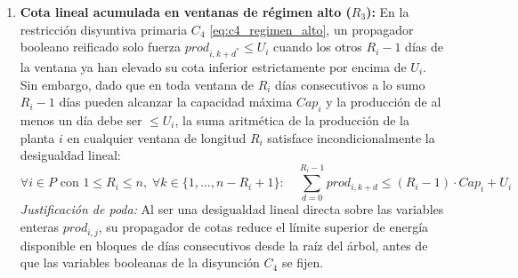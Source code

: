 \begin{enumerate}
    \item \textbf{Cota lineal acumulada en ventanas de régimen alto ($R_3$):}
    En la restricción disyuntiva primaria $C_4$ \eqref{eq:c4_regimen_alto}, un propagador booleano reificado solo fuerza $prod_{i, k+d^*} \le U_i$ cuando los otros $R_i - 1$ días de la ventana ya han elevado su cota inferior estrictamente por encima de $U_i$. Sin embargo, dado que en toda ventana de $R_i$ días consecutivos a lo sumo $R_i - 1$ días pueden alcanzar la capacidad máxima $Cap_i$ y la producción de al menos un día debe ser $\le U_i$, la suma aritmética de la producción de la planta $i$ en cualquier ventana de longitud $R_i$ satisface incondicionalmente la desigualdad lineal:
    \begin{equation}
        \forall i \in P \text{ con } 1 \le R_i \le n, \; \forall k \in \{1, \dots, n - R_i + 1\}: \quad \sum_{d=0}^{R_i - 1} prod_{i, k+d} \le (R_i - 1)\cdot Cap_i + U_i
        \label{eq:r3_ventana_lineal}
    \end{equation}
    \emph{Justificación de poda:} Al ser una desigualdad lineal directa sobre las variables enteras $prod_{i,j}$, su propagador de cotas reduce el límite superior de energía disponible en bloques de días consecutivos desde la raíz del árbol, antes de que las variables booleanas de la disyunción $C_4$ se fijen.


\end{enumerate}
